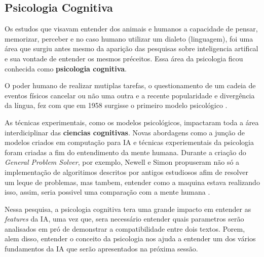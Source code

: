 \subsection{Psicologia Cognitiva}
Os estudos que visavam entender dos animais e humanos a capacidade de pensar, memorizar, perceber e no caso humano utilizar um dialeto (linguagem), foi uma área que surgiu antes mesmo da aparição das pesquisas sobre inteligencia artifical e sua vontade de entender os mesmos préceitos. Essa área da psicologia ficou conhecida como \textbf{psicologia cognitiva}.

O poder humano de realizar mutiplas tarefas, o questionamento de um cadeia de eventos físicos cancelar ou não uma outra e a recente popularidade e divergência da língua, fez com que em 1958 surgisse o primeiro modelo psicológico \cite[4-7]{broadbent1958perception}.

As técnicas experimentais, como os modelos psicológicos, impactaram toda a área interdiciplinar das \textbf{ciencias cognitivas}. Novas abordagens como a junção de modelos criados em computação para IA e técnicas experiementais da psicologia foram criadas a fim do entendimento da mente humana. Durante a criação do \textit{General Problem Solver}, por exemplo, Newell e Simon propuseram não só a implementação de algoritimos descritos por antigos estudiosos afim de resolver um leque de problemas, mas tambem, entender como a maquina estava realizando isso, assim, seria possivel uma comparação com a mente humana \cite[3-5]{newell1961gps, russell2003artificial}.

Nessa pesquisa, a psicologia cognitiva tera uma grande impacto em entender as \textit{features} da IA, uma vez que, sera necessário entender quais parametros serão analisados em pró de demonstrar a compatibilidade entre dois textos. Porem, alem disso, entender o conceito da psicologia nos ajuda a entender um dos vários fundamentos da IA que serão apresentados na próxima sessão.